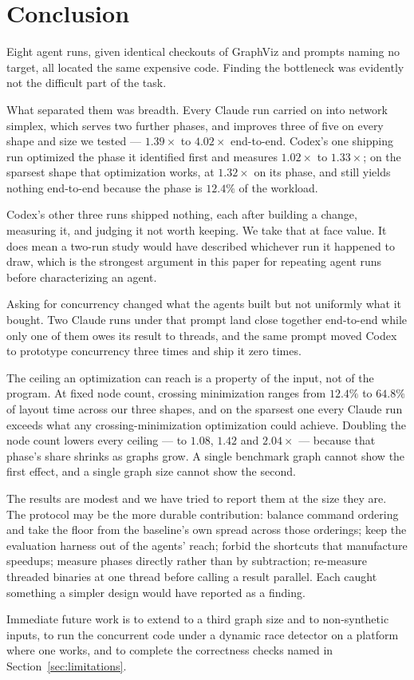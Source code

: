 \section{Conclusion}
\label{sec:conclusion}

Eight agent runs, given identical checkouts of GraphViz and prompts naming no
target, all located the same expensive code. Finding the bottleneck was
evidently not the difficult part of the task.

What separated them was breadth. Every Claude run carried on into network
simplex, which serves two further phases, and improves three of five on every
shape and size we tested --- $1.39\times$ to $4.02\times$ end-to-end. Codex's
one shipping run optimized the phase it identified first and measures
$1.02\times$ to $1.33\times$; on the sparsest shape that optimization works, at
$1.32\times$ on its phase, and still yields nothing end-to-end because the phase
is $12.4\%$ of the workload.

Codex's other three runs shipped nothing, each after building a change,
measuring it, and judging it not worth keeping. We take that at face value. It
does mean a two-run study would have described whichever run it happened to
draw, which is the strongest argument in this paper for repeating agent runs
before characterizing an agent.

Asking for concurrency changed what the agents built but not uniformly what it
bought. Two Claude runs under that prompt land close together end-to-end while
only one of them owes its result to threads, and the same prompt moved Codex to
prototype concurrency three times and ship it zero times.

The ceiling an optimization can reach is a property of the input, not of the
program. At fixed node count, crossing minimization ranges from $12.4\%$ to
$64.8\%$ of layout time across our three shapes, and on the sparsest one every
Claude run exceeds what any crossing-minimization optimization could achieve.
Doubling the node count lowers every ceiling --- to $1.08$, $1.42$ and
$2.04\times$ --- because that phase's share shrinks as graphs grow. A single
benchmark graph cannot show the first effect, and a single graph size cannot
show the second.

The results are modest and we have tried to report them at the size they are.
The protocol may be the more durable contribution: balance command ordering and
take the floor from the baseline's own spread across those orderings; keep the
evaluation harness out of the agents' reach; forbid the shortcuts that
manufacture speedups; measure phases directly rather than by subtraction;
re-measure threaded binaries at one thread before calling a result parallel.
Each caught something a simpler design would have reported as a finding.

Immediate future work is to extend to a third graph size and to non-synthetic
inputs, to run the concurrent code under a dynamic race detector on a platform
where one works, and to complete the correctness checks named in
Section~\ref{sec:limitations}.
